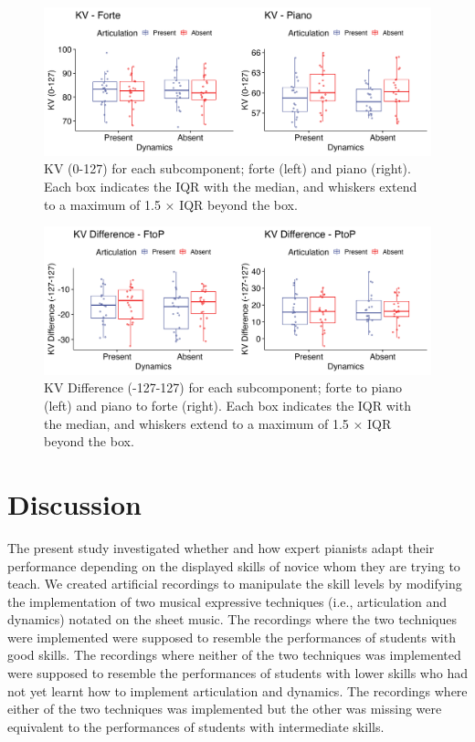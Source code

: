 \documentclass[
  man,floatsintext]{apa6}
\begin{document}
\begin{figure}
\includegraphics[width=1\linewidth]{manuscript_files/figure-latex/plot-vel-1-1} \caption{\label{fig:vel-1}KV (0-127) for each subcomponent; forte (left) and piano (right). Each box indicates the IQR with the median, and whiskers extend to a maximum of 1.5 × IQR beyond the box.}\label{fig:plot-vel-1}
\end{figure}

\begin{figure}
\includegraphics[width=1\linewidth]{manuscript_files/figure-latex/plot-vel-diff-1-1} \caption{\label{fig:vel-diff-1}KV Difference (-127-127) for each subcomponent; forte to piano (left) and piano to forte (right). Each box indicates the IQR with the median, and whiskers extend to a maximum of 1.5 × IQR beyond the box.}\label{fig:plot-vel-diff-1}
\end{figure}

\clearpage

\hypertarget{discussion}{%
\section{Discussion}\label{discussion}}

The present study investigated whether and how expert pianists adapt their performance depending on the displayed skills of novice whom they are trying to teach. We created artificial recordings to manipulate the skill levels by modifying the implementation of two musical expressive techniques (i.e., articulation and dynamics) notated on the sheet music. The recordings where the two techniques were implemented were supposed to resemble the performances of students with good skills. The recordings where neither of the two techniques was implemented were supposed to resemble the performances of students with lower skills who had not yet learnt how to implement articulation and dynamics. The recordings where either of the two techniques was implemented but the other was missing were equivalent to the performances of students with intermediate skills.
\end{document}
